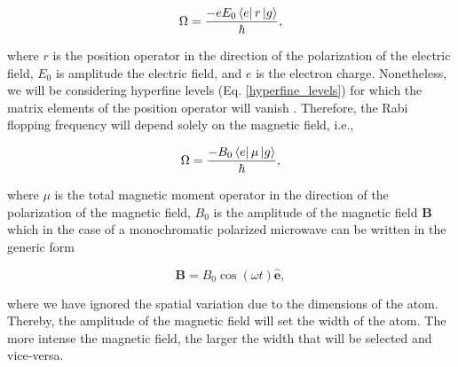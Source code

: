 \documentclass{article}
\begin{document}
\begin{equation*}
\Omega = \frac{- e E_{0} \bra{e} r \ket{g}}{\hbar},
\end{equation*}

where $r$ is the position operator in the direction of the polarization of the electric field, $E_{0}$ is amplitude the electric field, and $e$ is the electron charge. Nonetheless, we will be considering hyperfine levels (Eq. \ref{hyperfine_levels}) for which the matrix elements of the position operator will vanish  \cite{Steck2010}. Therefore, the Rabi flopping frequency will depend solely on the magnetic field, i.e.,

\begin{equation}\label{rabi_frequency_magnetic_field}
\Omega = \frac{- B_{0} \bra{e} \mu \ket{g}}{\hbar},
\end{equation}

where $\mu$ is the total magnetic moment operator in the direction of the polarization of the magnetic field, $B_{0}$ is the amplitude of the magnetic field $\textbf{B}$ which in the case of a monochromatic polarized microwave can be written in the generic form

\begin{equation}
    \textbf{B} =  B_{0} \cos(\omega t) \boldsymbol{\hat{e}},
\end{equation}

where we have ignored the spatial variation due to the dimensions of the atom. Thereby, the amplitude of the magnetic field will set the width of the atom. The more intense the magnetic field, the larger the width that will be selected and vice-versa.
\end{document}
